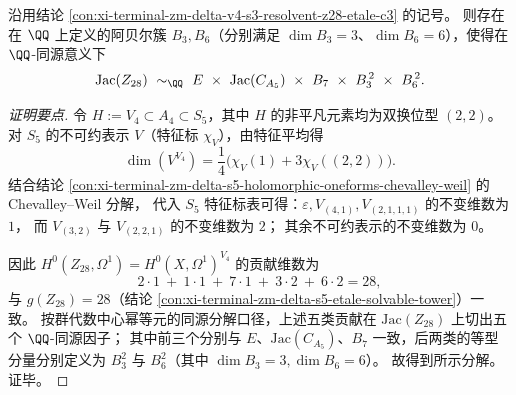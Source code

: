 \begin{conclusion}[\texorpdfstring{$Z_{28}=X/V_4$}{Z28} 的 Jacobian 的 \texorpdfstring{$1+2+7+6+12$}{1+2+7+6+12} 维同源分解]\label{con:xi-terminal-zm-delta-z28-jacobian-qisogeny-1-2-7-6-12}
沿用结论 \ref{con:xi-terminal-zm-delta-v4-s3-resolvent-z28-etale-c3} 的记号。
则存在在 \(\QQ\) 上定义的阿贝尔簇 \(B_3,B_6\)（分别满足 \(\dim B_3=3\)、\(\dim B_6=6\)），使得在 \(\QQ\)-同源意义下
\[
\mathrm{Jac}(Z_{28})
\ \sim_{\QQ}\
E\ \times\ \mathrm{Jac}(C_{A_5})\ \times\ B_7\ \times\ B_3^{\,2}\ \times\ B_6^{\,2}.
\]
\end{conclusion}
\begin{proof}[证明要点]
令 \(H:=V_4\subset A_4\subset S_5\)，其中 \(H\) 的非平凡元素均为双换位型 \((2,2)\)。
对 \(S_5\) 的不可约表示 \(V\)（特征标 \(\chi_V\)），由特征平均得
\[
\dim(V^{V_4})=\frac14\bigl(\chi_V(1)+3\chi_V((2,2))\bigr).
\]
结合结论 \ref{con:xi-terminal-zm-delta-s5-holomorphic-oneforms-chevalley-weil} 的 Chevalley--Weil 分解，
代入 \(S_5\) 特征标表可得：\(\varepsilon,V_{(4,1)},V_{(2,1,1,1)}\) 的不变维数为 \(1\)，
而 \(V_{(3,2)}\) 与 \(V_{(2,2,1)}\) 的不变维数为 \(2\)；
其余不可约表示的不变维数为 \(0\)。
\par
因此 \(H^0(Z_{28},\Omega^1)=H^0(X,\Omega^1)^{V_4}\) 的贡献维数为
\[
2\cdot 1\ +\ 1\cdot 1\ +\ 7\cdot 1\ +\ 3\cdot 2\ +\ 6\cdot 2
=28,
\]
与 \(g(Z_{28})=28\)（结论 \ref{con:xi-terminal-zm-delta-s5-etale-solvable-tower}）一致。
按群代数中心幂等元的同源分解口径，上述五类贡献在 \(\mathrm{Jac}(Z_{28})\) 上切出五个 \(\QQ\)-同源因子；
其中前三个分别与 \(E\)、\(\mathrm{Jac}(C_{A_5})\)、\(B_7\) 一致，后两类的等型分量分别定义为 \(B_3^{2}\) 与 \(B_6^{2}\)（其中 \(\dim B_3=3,\dim B_6=6\)）。
故得到所示分解。证毕。
\end{proof}

